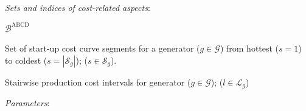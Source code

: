 \vspace{1em}
\noindent\textit{Sets and indices of cost-related aspects}:%
\begin{labeling}{$\mathcal{B}^{\text{ABCD}}$}
\setlength\itemsep{0.1em}
\item[$\mathcal{S}_g$] Set of start-up cost curve segments for a generator ($g\in\mathcal{G}$) from hottest ($s=1$) to coldest ($s=|\mathcal{S}_g|$); ($s \in \mathcal{S}_g$).  
\item[$\mathcal{L}_g$] Stairwise production cost intervals for generator ($g\in\mathcal{G}$); ($l\in \mathcal{L}_g$) 
\end{labeling}

\vspace{1em}
\noindent\textit{Parameters}:%
